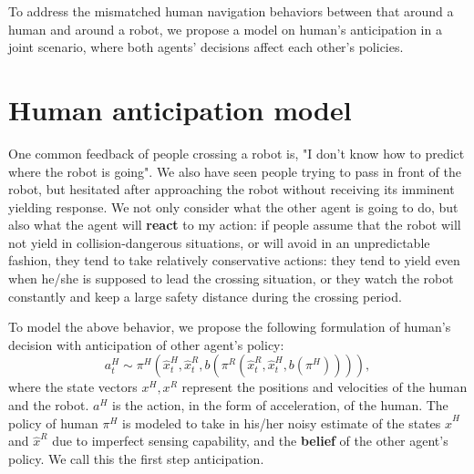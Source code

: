 \documentclass{article}
\begin{document}
To address the mismatched human navigation behaviors between that around a human and around a robot, we propose a model on human's anticipation in a joint scenario, where both agents' decisions affect each other's policies. 

\section{Human anticipation model}
One common feedback of people crossing a robot is, "I don't know how to predict where the robot is going". We also have seen people trying to pass in front of the robot, but hesitated after approaching the robot without receiving its imminent yielding response. We not only consider what the other agent is going to do, but also what the agent will \textbf{react} to my action: if people assume that the robot will not yield in collision-dangerous situations, or will avoid in an unpredictable fashion, they tend to take relatively conservative actions: they tend to yield even when he/she is supposed to lead the crossing situation, or they watch the robot constantly and keep a large safety distance during the crossing period.  

To model the above behavior, we propose the following formulation of human's decision with anticipation of other agent's policy:
\begin{equation}
a^H_t \sim \pi^H (\hat{x}^H_t, \hat{x}^R_t, b(\pi^R (\hat{x}^R_t, \hat{x}^H_t,b(\pi^H) ))) ,
\end{equation}
where the state vectors $x^H, x^R$ represent the positions and velocities of the human and the robot. $a^H$ is the action, in the form of acceleration, of the human. The policy of human $\pi^H$ is modeled to take in his/her noisy estimate of the states $\hat{x}^H$ and $\hat{x}^R$ due to imperfect sensing capability, and the \textbf{belief} of the other agent's policy. We call this the first step anticipation. 
\end{document}
